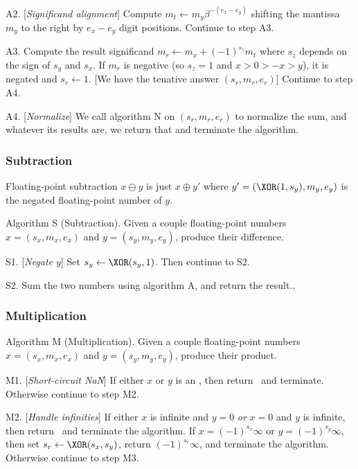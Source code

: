 \algstep A2. [{\it Significand alignment\/}] Compute $m_{t}\gets m_{y}\beta^{-(e_{x}-e_{y})}$
shifting the mantissa $m_{y}$ to the right by $e_{x}-e_{y}$ digit
positions. Continue to step A3.

\algstep A3. Compute the result significand $m_{r}\gets m_{x} + (-1)^{s_{z}}m_{t}$
where $s_{z}$ depends on the sign of $s_{y}$ and $s_{x}$. If $m_{r}$
is negative (so $s_{z}=1$ and $x>0>-x>y$), it is negated and $s_{r}\gets 1$.
[We have the tenative answer $(s_{r}, m_{r}, e_{r})$] Continue to step A4.

\algstep A4. [{\it Normalize\/}] We call algorithm N on $(s_{r}, m_{r}, e_{r})$
to normalize the sum, and whatever its results are, we return that and
terminate the algorithm.\quad\slug


\subsubsection{Subtraction}

\begin{rmk}[Subtraction]
  Floating-point subtraction $x\ominus y$ is just $x\oplus y'$ where
  $y' = (\XOR(1,s_{y}),m_{y},e_{y})$ is the negated floating-point
  number of $y$.
\end{rmk}

\algbegin Algorithm S (Subtraction). \label{alg:float-subtraction}Given a couple floating-point
numbers $x=(s_{x},m_{x},e_{x})$ and $y=(s_{y}, m_{y}, e_{y})$, produce
their difference.

\algstep S1. [{\it Negate $y$\/}] Set $s_{y}\gets\XOR(s_{y},1)$. Then
continue to S2.

\algstep S2. Sum the two numbers using algorithm A, and return the result.\quad\slug.

\subsubsection{Multiplication}


\algbegin Algorithm M (Multiplication). \label{alg:float-multiplication}Given a couple floating-point
numbers $x=(s_{x},m_{x},e_{x})$ and $y=(s_{y}, m_{y}, e_{y})$, produce
their product.

\algstep M1. [{\it Short-circuit NaN\/}] If either $x$ or $y$ is an
\NaN, then return \qNaN\ and terminate. Otherwise continue to step M2.

\algstep M2. [{\it Handle infinities\/}] If either $x$ is infinite and
$y=0$ \emph{or} $x=0$ and $y$ is infinite, then return \qNaN\ and
terminate the algorithm.
If $x=(-1)^{s_{x}}\infty$ or $y=(-1)^{s_{y}}\infty$, then set
$s_{r}\gets\XOR(s_{x},s_{y})$, return $(-1)^{s_{r}}\infty$, and
terminate the algorithm.
Otherwise continue to step M3.

